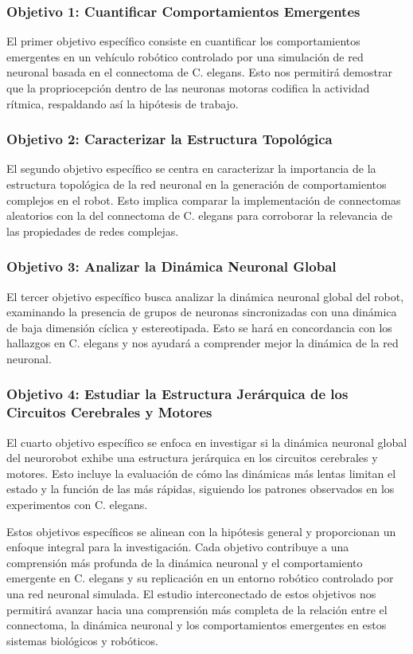  \subsubsection{Objetivo 1: Cuantificar Comportamientos Emergentes}
 
 El primer objetivo específico consiste en cuantificar los comportamientos emergentes en un vehículo robótico controlado por una simulación de red neuronal basada en el connectoma de C. elegans. Esto nos permitirá demostrar que la propriocepción dentro de las neuronas motoras codifica la actividad rítmica, respaldando así la hipótesis de trabajo.
 
 \subsubsection{Objetivo 2: Caracterizar la Estructura Topológica}
 
 El segundo objetivo específico se centra en caracterizar la importancia de la estructura topológica de la red neuronal en la generación de comportamientos complejos en el robot. Esto implica comparar la implementación de connectomas aleatorios con la del connectoma de C. elegans para corroborar la relevancia de las propiedades de redes complejas.
 
 
 \subsubsection{Objetivo 3: Analizar la Dinámica Neuronal Global}
 
 El tercer objetivo específico busca analizar la dinámica neuronal global del robot, examinando la presencia de grupos de neuronas sincronizadas con una dinámica de baja dimensión cíclica y estereotipada. Esto se hará en concordancia con los hallazgos en C. elegans y nos ayudará a comprender mejor la dinámica de la red neuronal.
 
 \subsubsection{Objetivo 4: Estudiar la Estructura Jerárquica de los Circuitos Cerebrales y Motores}
 
 El cuarto objetivo específico se enfoca en investigar si la dinámica neuronal global del neurorobot exhibe una estructura jerárquica en los circuitos cerebrales y motores. Esto incluye la evaluación de cómo las dinámicas más lentas limitan el estado y la función de las más rápidas, siguiendo los patrones observados en los experimentos con C. elegans.  
 
 Estos objetivos específicos se alinean con la hipótesis general y proporcionan un enfoque integral para la investigación. Cada objetivo contribuye a una comprensión más profunda de la dinámica neuronal y el comportamiento emergente en C. elegans y su replicación en un entorno robótico controlado por una red neuronal simulada. El estudio interconectado de estos objetivos nos permitirá avanzar hacia una comprensión más completa de la relación entre el connectoma, la dinámica neuronal y los comportamientos emergentes en estos sistemas biológicos y robóticos.
 
 
 



